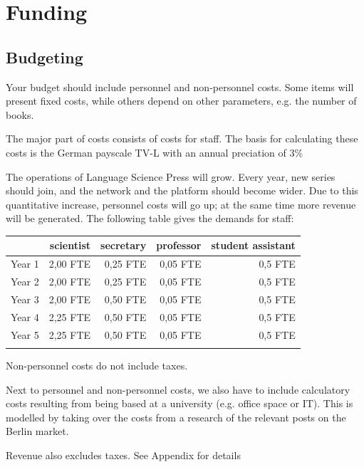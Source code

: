 \documentclass[nonflat,smallfont
]{langsci/langscibook}
\newcommand{\background}[1]{ 
  \vspace{5mm}
  \renewcommand{\tblslinecolour}{lsDarkBlue}
  \tblssy[red]{explore2}{Background}{\vspace*{-5mm}#1}
}
\newcommand{\langscisolution}[1]{
  \renewcommand{\tblslinecolour}{lsLightBlue}
  \tblssy{langsci}{LangSci solution}{\vspace*{-5mm}#1}
}
\renewcommand{\tblssy}[4][black!12]{%
  \renewcommand{\langscisymbol}{#2}\renewcommand{\tblsboxcolor}{#1}
  \begin{mdframed}[style=yellowexercise,frametitle={#3}]
    #4
  \end{mdframed}
}
\begin{document}
\chapter{Funding}

\section{Budgeting}

\background{Your budget should include personnel and non-personnel costs. Some items will present fixed costs, while others depend on other parameters, e.g. the number of books.}
\langscisolution{
The major part of costs consists of costs for staff. The basis for calculating these costs is the German payscale TV-L with an annual preciation of 3\%

The operations of Language Science Press will grow. Every year, new series should join, and the network and the platform should become wider. Due to this quantitative increase, personnel costs will go up; at the same time more revenue will be generated. The following table gives the demands for staff:%

\noindent
\begin{tabularx}{\textwidth}{Xrrrr}
\lsptoprule
         &  scientist  & secretary &   professor &   student assistant  \\
\midrule
Year 1 &  2,00 FTE                 &    0,25 FTE                       &   0,05 FTE    &   0,5 FTE                  \\
Year 2 &  2,00 FTE                 &    0,25 FTE                       &   0,05 FTE    &   0,5 FTE                  \\
Year 3 &  2,00 FTE                 &    0,50 FTE                        &   0,05 FTE    &   0,5 FTE                  \\
Year 4 &  2,25 FTE              &    0,50 FTE                        &   0,05 FTE    &   0,5 FTE                  \\
Year 5 &  2,25 FTE              &    0,50 FTE                        &   0,05 FTE    &   0,5 FTE                  \\
\lspbottomrule
\end{tabularx}

Non-personnel costs do not include taxes. 

Next to personnel and non-personnel costs, we also have to include calculatory costs resulting from being based at a university (e.g. office space or IT). This is modelled by taking over the costs from a research of the relevant posts on the Berlin market. 

Revenue also excludes taxes. See Appendix for details
}
\end{document}
